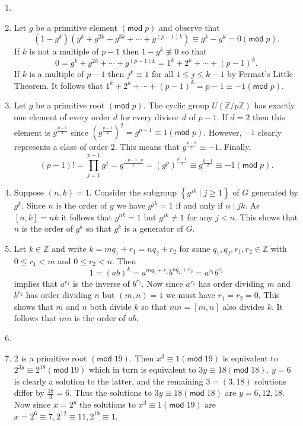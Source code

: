 \documentclass[12pt]{article}
\renewcommand{\pmod}[1]{\left(\mathsf{mod}\;#1\right)}
\begin{document}
\begin{enumerate}
\item %
\item %
Let $g$ be a primitive element $\pmod{p}$ and observe that
\begin{equation}\label{PowerSum}
\left(1-g^k\right)\left(g^k+g^{2k}+g^{3k}+\cdots
+g^{\left(p-1\right)k}\right)
\equiv g^k-g^k=0\pmod{p}.
\end{equation}
If $k$ is not a multiple of $p-1$ then $1-g^k\not\equiv 0$
so that \[0=g^k+g^{2k}+\cdots+g^{\left(p-1\right)k}
=1^k+2^k+\cdots+\left(p-1\right)^k.\]
If $k$ is a multiple of $p-1$ then $j^k\equiv 1$ for all
$1\le j\le k-1$ by Fermat's Little Theorem.
It follows that $1^k+2^k+\cdots+\left(p-1\right)^k=p-1
\equiv -1\pmod{p}$.

\item Let $g$ be a primitive root $\pmod{p}$.
The cyclic group $U\left(\mathbb{Z}/p\mathbb{Z}\right)$
has exactly one element of every order $d$ for every divisor
$d$ of $p-1$. If $d=2$ then this element is $g^{\frac{p-1}{2}}$
since $\left(g^{\frac{p-1}{2}}\right)^2=g^{p-1}\equiv 1\pmod{p}$.
However, $-1$ clearly represents a class of order $2$.
This means that $g^{\frac{p-1}{2}}\equiv -1$.
Finally,
\[\left(p-1\right)!=\prod_{j=1}^{p-1}g^j
=g^{\frac{\left(p-1\right)p}{2}}
=\left(g^p\right)^{\frac{p-1}{2}}
\equiv g^{\frac{p-1}{2}}
\equiv -1\pmod{p}.\]

\item\label{CyclicGenerators} %
Suppose $\left(n,k\right)=1$.
Consider the subgroup 
$\left\{g^{jk}\mid j\ge 1\right\}$
of $G$ generated by $g^k$.
Since $n$ is the order of $g$ we have $g^{jk}=1$
if and only if $n\mid jk$. As $\left[n,k\right]=nk$
it follows that $g^{nk}=1$ but $g^{jk}\ne 1$ for any $j<n$.
This shows that $n$ is the order of $g^k$
so that $g^k$ is a generator of $G$.

\item %
Let $k\in\mathbb{Z}$ and write $k=mq_1+r_1=nq_2+r_2$ for
some $q_1,q_2,r_1,r_2\in\mathbb{Z}$ with $0\le r_1<m$ and $0\le r_2<n$. Then 
\[1=\left(ab\right)^k=a^{mq_1+r_1}b^{nq_2+r_2}=a^{r_1}b^{r_2}\]
implies that $a^{r_1}$ is the inverse of $b^{r_2}$.
Now since $a^{r_1}$ has order dividing $m$ and $b^{r_2}$
has order dividing $n$ but $\left(m,n\right)=1$ we must
have $r_1=r_2=0$. This shows that $m$ and $n$ both divide $k$
so that $mn=\left[m,n\right]$ also divides $k$. It follows
that $mn$ is the order of $ab$.

\item %

\item %
2 is a primitive root $\pmod{19}$. Then $x^3\equiv 1\pmod{19}$
is equivalent to $2^{3y}\equiv 2^{18}\pmod{19}$
which in turn is equivalent to $3y\equiv 18\pmod{18}$.
$y=6$ is clearly a solution to the latter, and the remaining
$3=\left(3,18\right)$ solutions differ by $\frac{18}{3}=6$.
Thus the solutions to $3y\equiv 18\pmod{18}$ are $y=6,12,18$.
Now since $x=2^y$ the solutions to $x^3\equiv 1\pmod{19}$
are $x=2^6\equiv 7,
2^{12}\equiv 11,2^{18}\equiv 1$. 


\end{enumerate}
\end{document}
